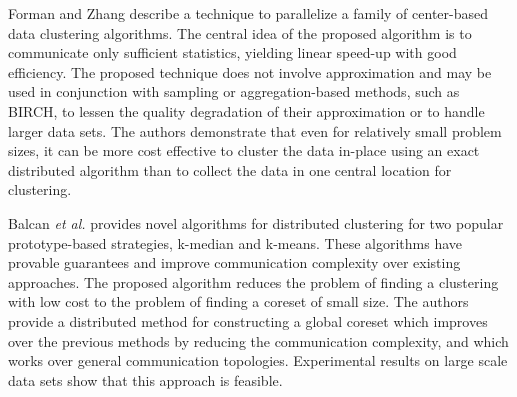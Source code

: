 \documentclass[preprint,12pt,authoryear,review]{elsarticle}
\begin{document}
Forman and Zhang \cite{FZ00} describe a technique to parallelize a family of center-based data clustering algorithms. The central idea of the proposed algorithm is to communicate only sufficient statistics, yielding linear speed-up with good efficiency. The proposed technique does not involve approximation and may be used in conjunction with sampling or aggregation-based methods, such as BIRCH, to lessen the quality degradation of their approximation or to handle larger data sets. The authors demonstrate that even for relatively small problem sizes, it can be more cost effective to cluster the data in-place using an exact distributed algorithm than to collect the data in one central location for clustering.


Balcan \textit{et al.} \cite{BEL13} provides novel algorithms for distributed clustering for two popular prototype-based strategies, k-median and k-means. These algorithms have provable guarantees and improve communication complexity over existing approaches. The proposed algorithm reduces the problem of finding a clustering with low cost to the problem of finding a coreset of small size. The authors provide a distributed method for constructing a global coreset which improves over the previous methods by reducing the communication complexity, and which works over general communication topologies. Experimental results on large scale data sets show that this approach is feasible. 

\end{document}
